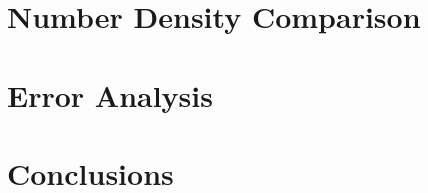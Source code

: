 \documentclass[twoside]{article}
\begin{document}
\section{Number Density Comparison}

\section{Error Analysis}

\section{Conclusions}






\end{document}
